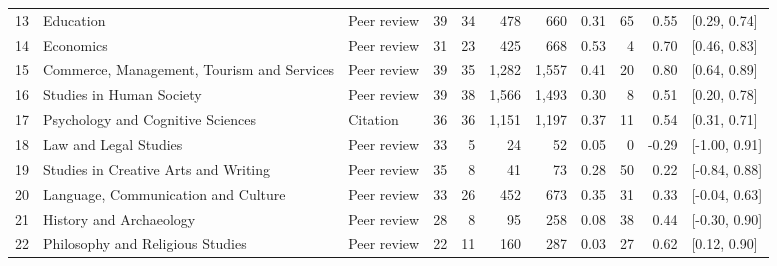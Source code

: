 \begin{table}[htbp]
{\begin{tabular}{llllrrrrrrl}
13 & Education & Peer review & 39 & 34 & 478 & 660 & 0.31 & 65 & 0.55 & [0.29, 0.74] \\
14 & Economics & Peer review & 31 & 23 & 425 & 668 & 0.53 & 4 & 0.70 & [0.46, 0.83] \\
15 & Commerce, Management, Tourism and Services & Peer review & 39 & 35 & 1,282 & 1,557 & 0.41 & 20 & 0.80 & [0.64, 0.89] \\
16 & Studies in Human Society & Peer review & 39 & 38 & 1,566 & 1,493 & 0.30 & 8 & 0.51 & [0.20, 0.78] \\
17 & Psychology and Cognitive Sciences & Citation & 36 & 36 & 1,151 & 1,197 & 0.37 & 11 & 0.54 & [0.31, 0.71] \\
18 & Law and Legal Studies & Peer review & 33 & 5 & 24 & 52 & 0.05 & 0 & -0.29 & [-1.00, 0.91] \\
19 & Studies in Creative Arts and Writing & Peer review & 35 & 8 & 41 & 73 & 0.28 & 50 & 0.22 & [-0.84, 0.88] \\
20 & Language, Communication and Culture & Peer review & 33 & 26 & 452 & 673 & 0.35 & 31 & 0.33 & [-0.04, 0.63] \\
21 & History and Archaeology & Peer review & 28 & 8 & 95 & 258 & 0.08 & 38 & 0.44 & [-0.30, 0.90] \\
22 & Philosophy and Religious Studies & Peer review & 22 & 11 & 160 & 287 & 0.03 & 27 & 0.62 & [0.12, 0.90] \\
\bottomrule
\end{tabular}}
\end{table}
